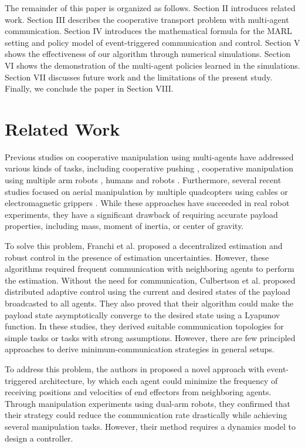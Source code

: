 \documentclass[letterpaper, 10 pt, conference]{ieeeconf} %
\begin{document}
The remainder of this paper is organized as follows. 
Section II introduces related work. Section III describes the cooperative transport problem with multi-agent communication.
Section IV introduces the mathematical formula for the MARL setting and policy model of event-triggered communication and control. Section V shows the effectiveness of our algorithm through numerical simulations.
Section VI shows the demonstration of the multi-agent policies learned in the simulations. Section VII discusses future work and the limitations of the present study.
Finally, we conclude the paper in Section VIII.

\section{Related Work}
Previous studies on cooperative manipulation using multi-agents have addressed various kinds of tasks, including cooperative pushing \cite{Fink2007, Fink2008}, cooperative manipulation using multiple arm robots \cite{Wang2015, WangICRA2016, WangIJRR2016}, humans and robots \cite{Sieber2015, Gienger2018}. 
Furthermore, several recent studies focused on aerial manipulation by multiple quadcopters using cables \cite{Michael2011, Jiang2013, Sreenath2013} or electromagnetic grippers \cite{Loianno2018, Mellinger2013}.
While these approaches have succeeded in real robot experiments, they have a significant drawback of requiring accurate payload properties, including mass, moment of inertia, or center of gravity.

To solve this problem, Franchi et al. \cite{Franchi2014, Franchi2015} proposed a decentralized estimation and robust control \cite{Petitti2016} in the presence of estimation uncertainties.
However, these algorithms required frequent communication with neighboring agents to perform the estimation.
Without the need for communication, Culbertson et al. \cite{Culbertson2018} proposed distributed adaptive control using the current and desired states of the payload broadcasted to all agents.
They also proved that their algorithm could make the payload state asymptotically converge to the desired state using a Lyapunov function.
In these studies, they derived suitable communication topologies for simple tasks or tasks with strong assumptions.
However, there are few principled approaches to derive minimum-communication strategies in general setups. 

To address this problem, the authors in \cite{Dohmann2020} proposed a novel approach with event-triggered architecture, by which each agent could minimize the frequency of receiving positions and velocities of end effectors from neighboring agents.
Through manipulation experiments using dual-arm robots, they confirmed that their strategy could reduce the communication rate drastically while achieving several manipulation tasks. However, their method requires a dynamics model to design a controller.
\end{document}
